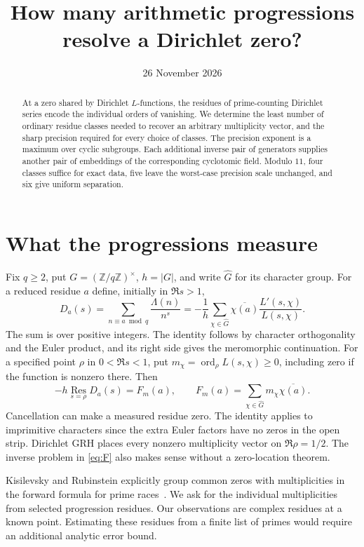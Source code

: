 \documentclass[11pt]{article}
\title{How many arithmetic progressions resolve a Dirichlet zero?}
\author{}
\date{26 November 2026}
\newcommand{\Z}{\mathbb Z}
\newcommand{\Res}{\operatorname*{Res}}
\begin{document}
\maketitle
\vspace{-1.6em}
\begin{abstract}
At a zero shared by Dirichlet $L$-functions, the residues of prime-counting Dirichlet series encode the individual orders of vanishing. We determine the least number of ordinary residue classes needed to recover an arbitrary multiplicity vector, and the sharp precision required for every choice of classes. The precision exponent is a maximum over cyclic subgroups. Each additional inverse pair of generators supplies another pair of embeddings of the corresponding cyclotomic field. Modulo $11$, four classes suffice for exact data, five leave the worst-case precision scale unchanged, and six give uniform separation.
\end{abstract}

\section{What the progressions measure}
Fix $q\ge2$, put $G=(\Z/q\Z)^\times$, $h=|G|$, and write $\widehat G$ for its character group. For a reduced residue $a$ define, initially in $\Re s>1$,
\[
 D_a(s)=\sum_{n\equiv a\bmod q}\frac{\Lambda(n)}{n^s}
 =-\frac1h\sum_{\chi\in\widehat G}\overline{\chi(a)}
                       \frac{L'(s,\chi)}{L(s,\chi)} .
\]
The sum is over positive integers. The identity follows by character orthogonality and the Euler product, and its right side gives the meromorphic continuation. For a specified point $\rho$ in $0<\Re s<1$, put $m_\chi=\operatorname{ord}_\rho L(s,\chi)\ge0$, including zero if the function is nonzero there. Then
\begin{equation}
 -h\Res_{s=\rho}D_a(s)=F_m(a),\qquad
 F_m(a)=\sum_{\chi\in\widehat G}m_\chi\overline{\chi(a)}. \label{eq:F}
\end{equation}
Cancellation can make a measured residue zero. The identity applies to imprimitive characters since the extra Euler factors have no zeros in the open strip. Dirichlet GRH places every nonzero multiplicity vector on $\Re\rho=1/2$. The inverse problem in \eqref{eq:F} also makes sense without a zero-location theorem.

Kisilevsky and Rubinstein explicitly group common zeros with multiplicities in the forward formula for prime races~\cite[\S2.3]{KR}. We ask for the individual multiplicities from selected progression residues. Our observations are complex residues at a known point. Estimating these residues from a finite list of primes would require an additional analytic error bound.
\end{document}
